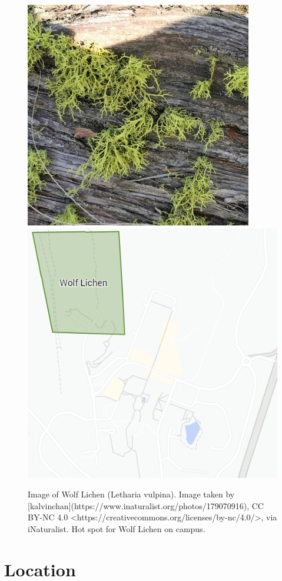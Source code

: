 \documentclass[
]{book}
\begin{document}
\begin{figure}

{\centering \includegraphics[width=0.49\linewidth,height=0.2\textheight]{plant_images/wolf_inat_11} \includegraphics[width=0.49\linewidth,height=0.2\textheight]{plant_images/wolflichen_hotspot_11} 

}

\caption{Image of Wolf Lichen (Letharia vulpina). Image taken by [kalvinchan](https://www.inaturalist.org/photos/179070916), CC BY-NC 4.0 <https://creativecommons.org/licenses/by-nc/4.0/>, via iNaturalist. Hot spot for Wolf Lichen on campus.}\label{fig:unnamed-chunk-10}
\end{figure}

\hypertarget{location-1}{%
\section{Location}\label{location-1}}

  
\end{document}
